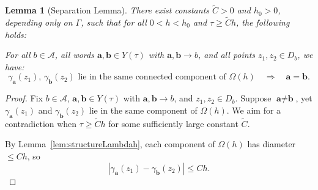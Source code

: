 \documentclass[12pt,letterpaper]{amsart}
\theoremstyle{plain}
\newtheorem{lemma}[prop]{Lemma}
\theoremstyle{definition}
\theoremstyle{remark}
\newcommand{\Aa}{\textbf{a}}
\newcommand{\Bb}{\textbf{b}}
\begin{document}
\begin{lemma}[Separation Lemma]\label{lem:separation}
There exist constants $\widetilde{C} > 0$ and $h_0 > 0$, depending only on $\Gamma$, such that for all $0 < h < h_0$ and $\tau \ge \widetilde{C} h$, the following holds:

For all $b \in \mathcal{A}$, all words $\Aa, \Bb \in Y(\tau)$ with $\Aa, \Bb \to b$, and all points $z_1, z_2 \in D_b$, we have:
\[
\gamma_{\Aa}(z_1),\, \gamma_{\Bb}(z_2) \text{ lie in the same connected component of } \Omega(h) \quad \Longrightarrow \quad \Aa = \Bb.
\]
\end{lemma}

\begin{proof}
Fix $b \in \mathcal{A}$, $\Aa, \Bb \in Y(\tau)$ with $\Aa, \Bb \to b$, and $z_1, z_2 \in D_b$. Suppose $\Aa \neq \Bb$, yet $\gamma_{\Aa}(z_1)$ and $\gamma_{\Bb}(z_2)$ lie in the same component of $\Omega(h)$. We aim for a contradiction when $\tau \ge \widetilde{C} h$ for some sufficiently large constant $\widetilde{C}$.

By Lemma~\ref{lem:structureLambdah}, each component of $\Omega(h)$ has diameter $\le Ch$, so
\begin{equation}\label{diamH}
|\gamma_{\Aa}(z_1) - \gamma_{\Bb}(z_2)| \le Ch.
\end{equation}


\end{proof}
\end{document}

